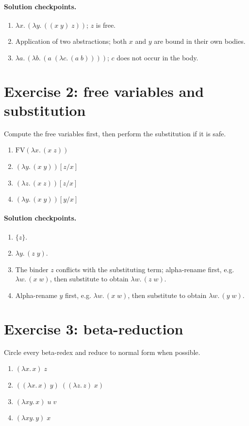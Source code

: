 \documentclass[11pt]{article}
\newcommand{\lam}[1]{\lambda #1.\,}
\newcommand{\FV}{\mathrm{FV}}
\newcommand{\subst}[2]{[#1/#2]}
\begin{document}
\paragraph{Solution checkpoints.}
\begin{enumerate}[nosep]
  \item $\lam{x}(\lam{y}((x\;y)\;z))$; $z$ is free.
  \item Application of two abstractions; both $x$ and $y$ are bound in their own bodies.
  \item $\lam{a}(\lam{b}(a\;(\lam{c}(a\;b))))$; $c$ does not occur in the body.
\end{enumerate}

\section*{Exercise 2: free variables and substitution}
Compute the free variables first, then perform the substitution if it is safe.
\begin{enumerate}
  \item $\FV(\lam{x}(x\;z))$
  \item $(\lam{y}(x\;y))\subst{z}{x}$
  \item $(\lam{z}(x\;z))\subst{z}{x}$
  \item $(\lam{y}(x\;y))\subst{y}{x}$
\end{enumerate}

\paragraph{Solution checkpoints.}
\begin{enumerate}[nosep]
  \item $\{z\}$.
  \item $\lam{y}(z\;y)$.
  \item The binder $z$ conflicts with the substituting term; alpha-rename first, e.g. $\lam{w}(x\;w)$, then substitute to obtain $\lam{w}(z\;w)$.
  \item Alpha-rename $y$ first, e.g. $\lam{w}(x\;w)$, then substitute to obtain $\lam{w}(y\;w)$.
\end{enumerate}

\section*{Exercise 3: beta-reduction}
Circle every beta-redex and reduce to normal form when possible.
\begin{enumerate}
  \item $(\lam{x}x)\;z$
  \item $((\lam{x}x)\;y)\;((\lam{z}z)\;x)$
  \item $(\lam{x y}x)\;u\;v$
  \item $(\lam{x y}y)\;x$
\end{enumerate}
\end{document}
